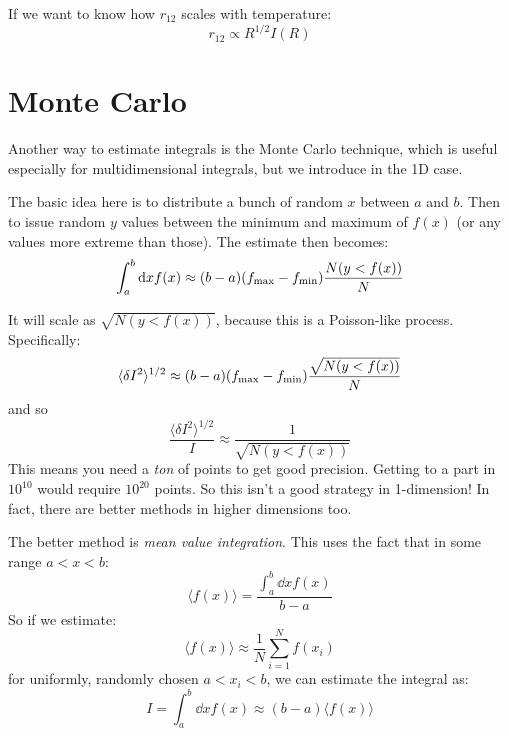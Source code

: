 If we want to know how $r_{12}$ scales with temperature:
\begin{equation}
r_{12} \propto R^{1/2} I(R)
\end{equation}

\section{Monte Carlo}


Another way to estimate integrals is the Monte Carlo technique, which
is useful especially for multidimensional integrals, but we introduce
in the 1D case.

The basic idea here is to distribute a bunch of random $x$ between $a$
and $b$. Then to issue random $y$ values between the minimum and
maximum of $f(x)$ (or any values more extreme than those). The
estimate then becomes:
\begin{equation}
\int_a^b {\rm d}x f(x) \approx (b-a) (f_{\rm max} - f_{\rm min})
\frac{N(y<f(x))}{N}
\end{equation}


\begin{answer}
It will scale as $\sqrt{N(y<f(x))}$, because this is a Poisson-like
process.  Specifically:
\begin{equation}
\langle\delta I^2 \rangle^{1/2} \approx (b-a) (f_{\rm max} - f_{\rm min})
\frac{\sqrt{N(y<f(x))}}{N}
\end{equation}
and so
\begin{equation}
\frac{\langle\delta I^2 \rangle^{1/2}}{I} \approx 
\frac{1}{\sqrt{N(y<f(x))}}
\end{equation}
This means you need a {\it ton} of points to get good
precision. Getting to a part in $10^{10}$ would require $10^{20}$
points. So this isn't a good strategy in 1-dimension! In fact, there
are better methods in higher dimensions too.
\end{answer}

The better method is {\it mean value integration}. This uses the fact
that in some range $a<x<b$:
\begin{equation}
\langle f(x) \rangle = \frac{\int_a^b \dd{x}  f(x)}{b-a}
\end{equation}
So if we estimate:
\begin{equation}
\langle f(x) \rangle \approx \frac{1}{N}\sum_{i=1}^N f(x_i)
\end{equation}
for uniformly, randomly chosen $a<x_i<b$, we can estimate the integral
as:
\begin{equation}
I = \int_a^b \dd{x}  f(x) \approx (b-a) \langle f(x)\rangle
\end{equation}

